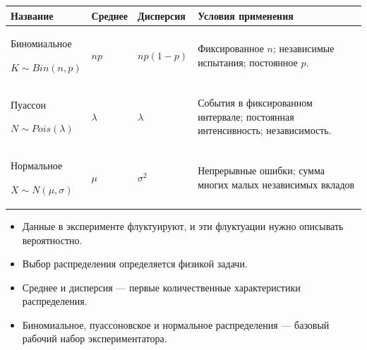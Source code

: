 \documentclass[
  russian,
  12pt,
  a4paper,
  a4paper,
  openany]{scrbook}
\newcounter{none} %
\providecommand{\tightlist}{%
  \setlength{\itemsep}{0pt}\setlength{\parskip}{0pt}}
\begin{document}
{\def\LTcaptype{none} %
\begin{longtable}[]{@{}
  >{\centering\arraybackslash}p{}
  >{\centering\arraybackslash}p{}
  >{\centering\arraybackslash}p{}
  >{\centering\arraybackslash}p{}@{}}
\toprule\noalign{}
\begin{minipage}[b]{\linewidth}\centering
Название
\end{minipage} & \begin{minipage}[b]{\linewidth}\centering
Среднее
\end{minipage} & \begin{minipage}[b]{\linewidth}\centering
Дисперсия
\end{minipage} & \begin{minipage}[b]{\linewidth}\centering
Условия применения
\end{minipage} \\
\midrule\noalign{}
\endhead
\bottomrule\noalign{}
\endlastfoot
Биномиальное

\(K\sim Bin(n,p)\) & \(np\) & \(np(1-p)\) & Фиксированное \(n\);
независимые испытания; постоянное \(p\). \\
Пуассон

\(N\sim Pois(\lambda)\) & \(\lambda\) & \(\lambda\) & События в
фиксированном интервале; постоянная интенсивность; независимость. \\
Нормальное

\(X\sim N(\mu,\sigma)\) & \(\mu\) & \(\sigma^2\) & Непрерывные ошибки;
сумма многих малых независимых вкладов \\
\end{longtable}
}

\begin{bookchaptersummary}

\begin{itemize}
\tightlist
\item
  Данные в эксперименте флуктуируют, и эти флуктуации нужно описывать
  вероятностно.
\item
  Выбор распределения определяется физикой задачи.
\item
  Среднее и дисперсия --- первые количественные характеристики
  распределения.
\item
  Биномиальное, пуассоновское и нормальное распределения --- базовый
  рабочий набор экспериментатора.
\end{itemize}

\end{bookchaptersummary}
\end{document}
